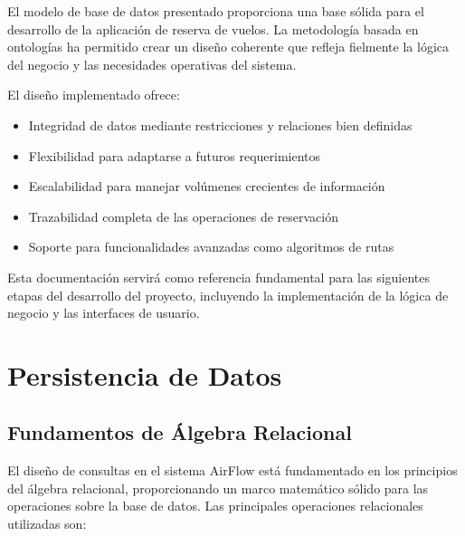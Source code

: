 \documentclass[12pt,a4paper]{article}
\begin{document}
El modelo de base de datos presentado proporciona una base sólida para el desarrollo de la aplicación de reserva de vuelos. La metodología basada en ontologías ha permitido crear un diseño coherente que refleja fielmente la lógica del negocio y las necesidades operativas del sistema.

El diseño implementado ofrece:
\begin{itemize}
    \item Integridad de datos mediante restricciones y relaciones bien definidas
    \item Flexibilidad para adaptarse a futuros requerimientos
    \item Escalabilidad para manejar volúmenes crecientes de información
    \item Trazabilidad completa de las operaciones de reservación
    \item Soporte para funcionalidades avanzadas como algoritmos de rutas
\end{itemize}

Esta documentación servirá como referencia fundamental para las siguientes etapas del desarrollo del proyecto, incluyendo la implementación de la lógica de negocio y las interfaces de usuario.

\section{Persistencia de Datos}

\subsection{Fundamentos de Álgebra Relacional}

El diseño de consultas en el sistema AirFlow está fundamentado en los principios del álgebra relacional, proporcionando un marco matemático sólido para las operaciones sobre la base de datos. Las principales operaciones relacionales utilizadas son:
\end{document}
